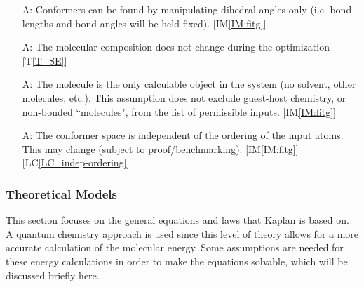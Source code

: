 \documentclass[12pt]{article}
\newcommand{\tref}[1]{T\ref{#1}}
\newcounter{assumpnum} %
\newcommand{\iref}[1]{IM\ref{#1}}
\newcommand{\lcref}[1]{LC\ref{#1}}
\newcommand{\progname}{Kaplan} %
\begin{document}
\begin{itemize}
\item[A\refstepcounter{assumpnum}\theassumpnum \label{A:dihedral-only}:] 
Conformers can be found by manipulating dihedral angles only (i.e. bond lengths 
and bond angles will be held fixed). [\iref{IM:fitg}]

\item[A\refstepcounter{assumpnum}\theassumpnum \label{A:fixed-mol}:] The 
molecular composition does not change during the 
optimization [\tref{T_SE}]

\item[A\refstepcounter{assumpnum}\theassumpnum \label{A:one-mol}:] The 
molecule is the only calculable object in the system (no solvent, other 
molecules, etc.). This assumption does not exclude guest-host chemistry, or 
non-bonded ``molecules", from the list of permissible inputs. [\iref{IM:fitg}]

\item[A\refstepcounter{assumpnum}\theassumpnum \label{A:atom-ordering}:] The 
conformer space is independent of the ordering of the input atoms. This may 
change (subject to proof/benchmarking). 
[\iref{IM:fitg}][\lcref{LC_indep-ordering}]


\end{itemize}

\subsubsection{Theoretical Models}\label{sec_theoretical}

This section focuses on the general equations and laws that \progname{} is based
on. A quantum chemistry approach is used since this level of theory allows for 
a more accurate calculation of the molecular energy. Some assumptions are 
needed for these energy calculations in order to make the equations solvable, 
which will be discussed briefly here.

~\newline
\end{document}
